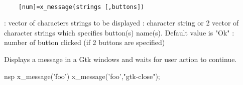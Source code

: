 \begin{mandesc}
  \\ %
\end{mandesc}
\label{x-message}
\begin{calling_sequence}
  \begin{verbatim}
    [num]=x_message(strings [,buttons])   
  \end{verbatim}
\end{calling_sequence}
\begin{parameters}
  \begin{varlist}
    : vector of characters strings to be displayed
    : character string or 2 vector of character strings which specifies button(s) name(s). Default value is "Ok"
    : number  of button clicked (if 2 buttons are specified)
  \end{varlist}
\end{parameters}
\begin{mandescription}
  Displays a message in a Gtk windows and waits for user action to continue. 
\end{mandescription}
\begin{examples}
\begin{mintednsp}{nsp}
x_message('foo')
x_message('foo',"gtk-close");
\end{mintednsp}
\end{examples}
\begin{manseealso}
\end{manseealso}

